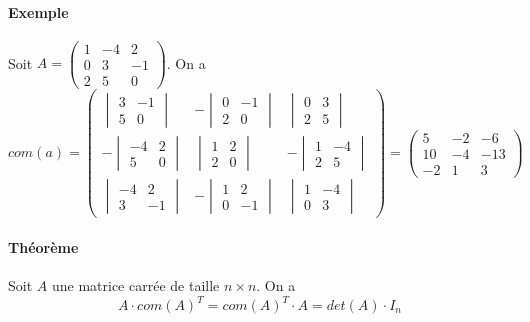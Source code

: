 \paragraph{Exemple} Soit $A = \begin{pmatrix} 1 & -4 & 2 \\ 0 & 3 & -1 \\ 2 & 5 & 0 \end{pmatrix}$. On a
$$com(a) = \begin{pmatrix}
  \begin{vmatrix} 3 & -1 \\ 5 & 0 \end{vmatrix} & -\begin{vmatrix} 0 & -1 \\ 2 & 0 \end{vmatrix} & \begin{vmatrix} 0 & 3 \\ 2 & 5 \end{vmatrix} \\
  -\begin{vmatrix} -4 & 2 \\ 5 & 0 \end{vmatrix} & \begin{vmatrix} 1 & 2 \\ 2 & 0 \end{vmatrix} & -\begin{vmatrix} 1 & -4 \\ 2 & 5 \end{vmatrix} \\
  \begin{vmatrix} -4 & 2 \\ 3 & -1 \end{vmatrix} & -\begin{vmatrix} 1 & 2 \\ 0 & -1 \end{vmatrix} & \begin{vmatrix} 1 & -4 \\ 0 & 3 \end{vmatrix}
\end{pmatrix} = \begin{pmatrix}
  5 & -2 & -6 \\
  10 & -4 & -13 \\
  -2 & 1 & 3
\end{pmatrix}$$

\paragraph{Théorème} Soit $A$ une matrice carrée de taille $n \times n$. On a
$$A \cdot com(A)^{T} = com(A)^{T} \cdot A = det(A) \cdot I_n$$

